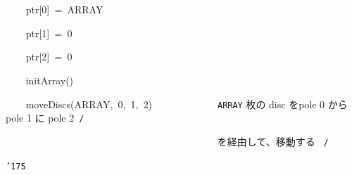 \documentclass[a4paper,10pt]{article}
\def\mc{\relax}
\begin{document}
\noindent
\mbox{}{\tt\mc \ }{\tt\mc \ }{\tt\mc \ }{\tt\mc \ }ptr[0]{\tt\mc \ }={\tt\mc \ }ARRAY

\noindent
\mbox{}{\tt\mc \ }{\tt\mc \ }{\tt\mc \ }{\tt\mc \ }ptr[1]{\tt\mc \ }={\tt\mc \ }0

\noindent
\mbox{}{\tt\mc \ }{\tt\mc \ }{\tt\mc \ }{\tt\mc \ }ptr[2]{\tt\mc \ }={\tt\mc \ }0

\noindent
\mbox{}\hfill

\noindent
\mbox{}{\tt\mc \ }{\tt\mc \ }{\tt\mc \ }{\tt\mc \ }initArray()

\noindent
\mbox{}{\tt\mc \ }{\tt\mc \ }{\tt\mc \ }{\tt\mc \ }moveDiscs(ARRAY,{\tt\mc \ }0,{\tt\mc \ }1,{\tt\mc \ }2){\tt\mc \ }{\tt\mc \ }{\tt\mc \ }{\tt\mc \ }{\tt\mc \ }{\tt\mc \ }{\tt\mc \ }{\tt\mc \ }{\tt\mc \ }{\tt\mc \ }{\tt\mc \ }\rm\mc {\tt /}{\tt *}\  \ {\tt ARRAY} 枚の disc をpole 0 から pole 1 に pole 2\hfill \rm\mc \ {\tt *}{\tt /}
\tt\mc 

\noindent
\mbox{}{\tt\mc \ }{\tt\mc \ }{\tt\mc \ }{\tt\mc \ }{\tt\mc \ }{\tt\mc \ }{\tt\mc \ }{\tt\mc \ }{\tt\mc \ }{\tt\mc \ }{\tt\mc \ }{\tt\mc \ }{\tt\mc \ }{\tt\mc \ }{\tt\mc \ }{\tt\mc \ }{\tt\mc \ }{\tt\mc \ }{\tt\mc \ }{\tt\mc \ }{\tt\mc \ }{\tt\mc \ }{\tt\mc \ }{\tt\mc \ }{\tt\mc \ }{\tt\mc \ }{\tt\mc \ }{\tt\mc \ }{\tt\mc \ }{\tt\mc \ }{\tt\mc \ }{\tt\mc \ }{\tt\mc \ }{\tt\mc \ }{\tt\mc \ }{\tt\mc \ }{\tt\mc \ }{\tt\mc \ }{\tt\mc \ }{\tt\mc \ }\rm\mc {\tt /}{\tt *}\  \ を経由して、移動する \hfill \rm\mc \ {\tt *}{\tt /}
\tt\mc 

\noindent
\mbox{}{\tt\char'175}

\rm\mc
\end{document}
